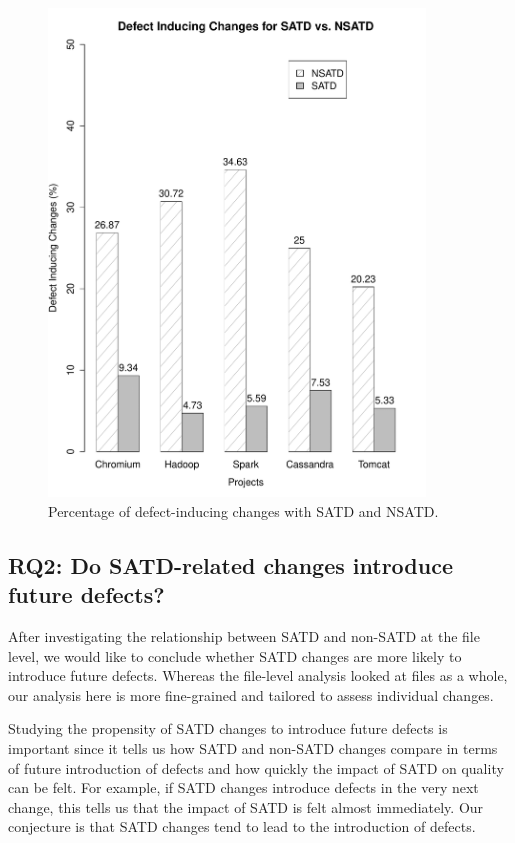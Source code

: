 \begin{figure}[tb!]
	\centering
	\includegraphics[width=100mm]{figures/chapter3/bug_inducing_changes}
	\caption{Percentage of defect-inducing changes with SATD and NSATD.}
	\label{figure:bug_inducing_changes}
\end{figure}

\subsection*{RQ2: Do SATD-related changes introduce future defects?}

 After investigating the relationship between SATD and non-SATD at the file level, we would like to conclude whether SATD changes are more likely to introduce future defects. Whereas the file-level analysis looked at files as a whole, our analysis here is more fine-grained and tailored to assess individual changes.

Studying the propensity of SATD changes to introduce future defects is important since it tells us how SATD and non-SATD changes compare in terms of future introduction of defects and how quickly the impact of SATD on quality can be felt. For example, if SATD changes introduce defects in the very next change, this tells us that the impact of SATD is felt almost immediately. Our conjecture is that SATD changes tend to lead to the introduction of defects.


